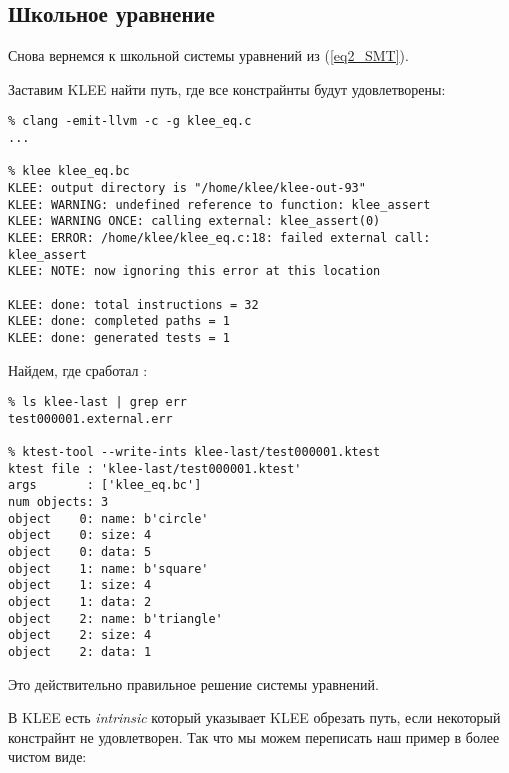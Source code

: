 \subsection{Школьное уравнение}

Снова вернемся к школьной системы уравнений из (\ref{eq2_SMT}).

Заставим KLEE найти путь, где все констрайнты будут удовлетворены:



\begin{lstlisting}
% clang -emit-llvm -c -g klee_eq.c
...

% klee klee_eq.bc
KLEE: output directory is "/home/klee/klee-out-93"
KLEE: WARNING: undefined reference to function: klee_assert
KLEE: WARNING ONCE: calling external: klee_assert(0)
KLEE: ERROR: /home/klee/klee_eq.c:18: failed external call: klee_assert
KLEE: NOTE: now ignoring this error at this location

KLEE: done: total instructions = 32
KLEE: done: completed paths = 1
KLEE: done: generated tests = 1
\end{lstlisting}

Найдем, где сработал :

\begin{lstlisting}
% ls klee-last | grep err
test000001.external.err

% ktest-tool --write-ints klee-last/test000001.ktest
ktest file : 'klee-last/test000001.ktest'
args       : ['klee_eq.bc']
num objects: 3
object    0: name: b'circle'
object    0: size: 4
object    0: data: 5
object    1: name: b'square'
object    1: size: 4
object    1: data: 2
object    2: name: b'triangle'
object    2: size: 4
object    2: data: 1
\end{lstlisting}

Это действительно правильное решение системы уравнений.

В KLEE есть \textit{intrinsic}  который указывает KLEE обрезать путь, если некоторый констрайнт не удовлетворен.
Так что мы можем переписать наш пример в более чистом виде:



